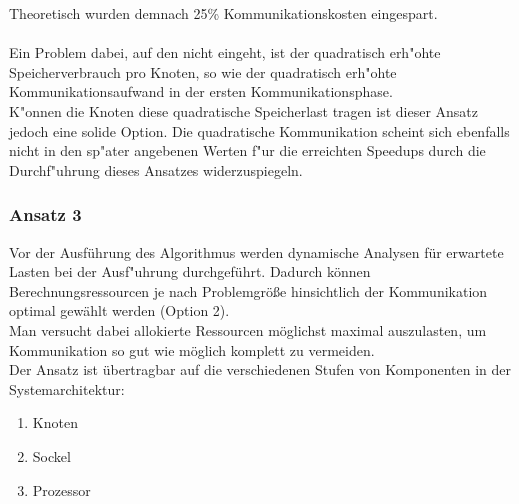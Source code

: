 Theoretisch wurden demnach 25\% Kommunikationskosten eingespart.\\
\\
Ein Problem dabei, auf den \cite{mainpaper} nicht eingeht, ist der quadratisch erh"ohte Speicherverbrauch pro Knoten, so wie der quadratisch erh"ohte Kommunikationsaufwand in der ersten Kommunikationsphase.\\
K"onnen die Knoten diese quadratische Speicherlast tragen ist dieser Ansatz jedoch eine solide Option. Die quadratische Kommunikation scheint sich ebenfalls nicht in den sp"ater angebenen Werten f"ur die erreichten Speedups durch die Durchf"uhrung dieses Ansatzes widerzuspiegeln.

\subsubsection{Ansatz 3}
Vor der Ausführung des Algorithmus werden dynamische Analysen für erwartete Lasten bei der Ausf"uhrung durchgeführt. Dadurch können Berechnungsressourcen je nach Problemgröße hinsichtlich der Kommunikation optimal gewählt werden (Option 2).\\
Man versucht dabei allokierte Ressourcen möglichst maximal auszulasten, um Kommunikation so gut wie möglich komplett zu vermeiden.\\
Der Ansatz ist übertragbar auf die verschiedenen Stufen von Komponenten in der Systemarchitektur:
\begin{enumerate}
	\item Knoten
	\item Sockel
	\item Prozessor
\end{enumerate}


